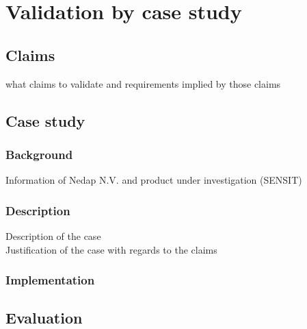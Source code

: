 \chapter{Validation by case study}
\section{Claims}
what claims to validate and requirements implied by those claims
\section{Case study}
\subsection{Background}
Information of Nedap N.V. and product under investigation (SENSIT)
\subsection{Description}
Description of the case \\
Justification of the case with regards to the claims
\subsection{Implementation}
\section{Evaluation}
